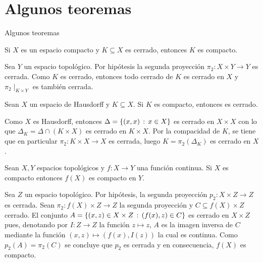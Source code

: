 \documentclass[10pt]{beamer}
\begin{document}
\section{Algunos teoremas}
\begin{frame}{Algunos teoremas}
  
    \begin{theorem}
  Si $X$ es un espacio compacto y $K\subseteq X$ es cerrado,
  entonces $K$ es compacto.
\end{theorem}
Sea $Y$ un espacio topológico. Por hipótesis la segunda proyección
  $\pi_2:X\times Y\longrightarrow Y$  es cerrada. Como $K$ es cerrado,
  entonces todo cerrado de $K$ es cerrado en $X$ y $\pi_2\mid_{K\times Y}$
  es también cerrada.
\end{frame}
\begin{frame}
  \begin{theorem}
  Sean $X$ un espacio de Hausdorff y $K\subseteq X$. Si $K$ es compacto,
  entonces es cerrado.
\end{theorem}
Como $X$ es Hausdorff, entonces $\Delta=\left\{(x,x)\,:\,x\in X\right\}$ es cerrado en $X\times X$
  con lo que $\Delta_K=\Delta\cap(K\times X)$ es cerrado en $K\times X$. Por la compacidad
  de $K$, se tiene que en particular $\pi_2:K\times X\longrightarrow X$ es cerrada, luego
  $K=\pi_2(\Delta_K)$ es cerrado en $X$.
\end{frame}
\begin{frame}
  \begin{theorem}
  Sean $X,Y$ espacios topológicos y $f:X\longrightarrow Y$ una función continua.
  Si $X$ es compacto entonces $f(X)$ es compacto en $Y$.
\end{theorem}


  Sea $Z$ un espacio topológico. Por hipótesis, la segunda proyección
  $p_2:X\times Z\longrightarrow Z$ es cerrada. Sean $\pi_2:f(X)\times Z\longrightarrow Z$
  la segunda proyección y $C\subseteq f(X)\times Z$ cerrado. El conjunto
  $A=\left\{(x,z)\in X\times Z\,:\,(f(x),z)\in C\right\}$ es cerrado en $X\times Z$ pues,
  denotando por $I:Z\longrightarrow Z$ la función $z\longmapsto z$,
  $A$ es la imagen inversa de $C$ mediante la función $(x,z)\longmapsto(f(x),I(z))$ la cual
  es continua. Como $p_2(A)=\pi_2(C)$ se concluye que $p_2$ es cerrada y en consecuencia,
  $f(X)$ es compacto.
\end{frame}
\end{document}
